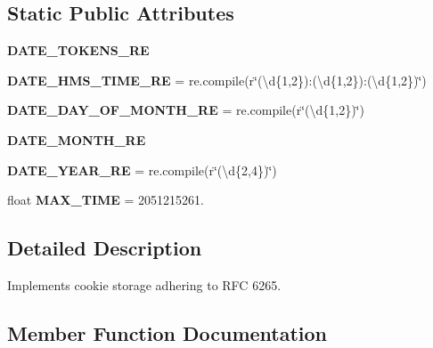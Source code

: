 \subsection*{Static Public Attributes}
\begin{DoxyCompactItemize}
\item 
{\bfseries D\+A\+T\+E\+\_\+\+T\+O\+K\+E\+N\+S\+\_\+\+RE}
\item 
\mbox{\label{classaiohttp_1_1cookiejar_1_1_cookie_jar_ac1960c3b64ae978a0f000ad4680ee736}} 
{\bfseries D\+A\+T\+E\+\_\+\+H\+M\+S\+\_\+\+T\+I\+M\+E\+\_\+\+RE} = re.\+compile(r\char`\"{}(\textbackslash{}d\{1,2\})\+:(\textbackslash{}d\{1,2\})\+:(\textbackslash{}d\{1,2\})\char`\"{})
\item 
\mbox{\label{classaiohttp_1_1cookiejar_1_1_cookie_jar_a08527aa57bcefe667dcc64b24f7dc83f}} 
{\bfseries D\+A\+T\+E\+\_\+\+D\+A\+Y\+\_\+\+O\+F\+\_\+\+M\+O\+N\+T\+H\+\_\+\+RE} = re.\+compile(r\char`\"{}(\textbackslash{}d\{1,2\})\char`\"{})
\item 
{\bfseries D\+A\+T\+E\+\_\+\+M\+O\+N\+T\+H\+\_\+\+RE}
\item 
\mbox{\label{classaiohttp_1_1cookiejar_1_1_cookie_jar_a5c9a0dae20fcdccefc12755bf7542228}} 
{\bfseries D\+A\+T\+E\+\_\+\+Y\+E\+A\+R\+\_\+\+RE} = re.\+compile(r\char`\"{}(\textbackslash{}d\{2,4\})\char`\"{})
\item 
\mbox{\label{classaiohttp_1_1cookiejar_1_1_cookie_jar_a126d4d6b379f2eec8b51280e713039c1}} 
float {\bfseries M\+A\+X\+\_\+\+T\+I\+ME} = 2051215261.
\end{DoxyCompactItemize}


\subsection{Detailed Description}
\begin{DoxyVerb}Implements cookie storage adhering to RFC 6265.\end{DoxyVerb}
 

\subsection{Member Function Documentation}
\mbox{\label{classaiohttp_1_1cookiejar_1_1_cookie_jar_a3e75b49672d8145ac740c8892bb3b077}} 
